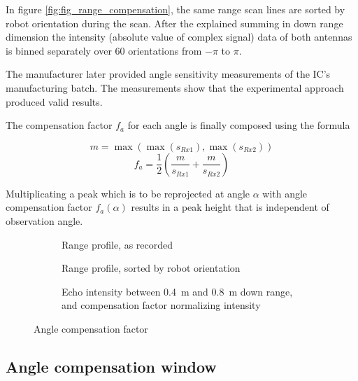 In figure \cref{fig:fig_range_compensation}, the same range scan lines are sorted by robot
orientation during the scan. After the explained summing in down range
dimension the intensity (absolute value of complex signal) data of both
antennas is binned separately over 60 orientations from \(-\pi\) to
\(\pi\).

The manufacturer later provided angle sensitivity measurements of the
IC's manufacturing batch. The measurements show that the
experimental approach produced valid results.

The compensation factor \(f_a\) for each angle is finally composed using
the formula

\[m = \max \left( \max (s_{Rx1}), \max (s_{Rx2}) \right)\] \[
f_a = \frac{1}{2}
  \left(
    \frac{m}{ s_{Rx1} } +
    \frac{m}{ s_{Rx2} }
  \right)
\]

Multiplicating a peak which is to be reprojected at angle \(\alpha\)
with angle compensation factor \(f_a(\alpha)\) results in a peak height
that is independent of observation angle.

\begin{figure}[htbp]
    \centering
    \begin{subfigure}{\textwidth}
        \centering
        \def\svgscale{0.8} \small
        
        \caption{Range profile, as recorded}
        \bigskip
    \end{subfigure}
    \begin{subfigure}{\textwidth}
        \centering
        \def\svgscale{0.8} \small
        
        \caption{Range profile, sorted by robot orientation}
        \bigskip
    \end{subfigure}
    \begin{subfigure}{\textwidth}
        \centering
        \def\svgscale{0.8} \small
        
        \caption{Echo intensity between \SI{0.4}{m} and \SI{0.8}{m} down range, and compensation factor normalizing intensity}
        \bigskip
    \end{subfigure}
    \caption{Angle compensation factor}
    \label{fig:fig_angle_compensation}
\end{figure}

\subsection{Angle compensation window}\label{angle-compensation-window}

